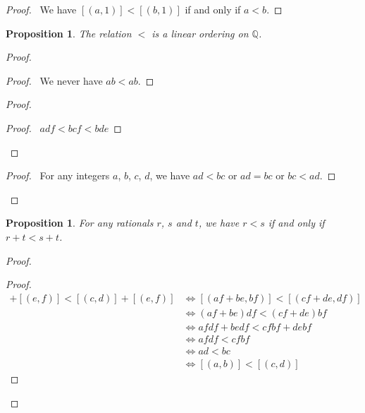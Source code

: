 \documentclass{book}
\let\qed\relax
\newtheorem{prop}[ax]{Proposition}
\theoremstyle{definition}
\begin{document}
\begin{proof}
\pf\ We have $[(a,1)] < [(b,1)]$ if and only if $a < b$. \qed
\end{proof}

\begin{prop}
The relation $<$ is a linear ordering on $\mathbb{Q}$.
\end{prop}

\begin{proof}
\pf
{}
\begin{proof}
	\pf\ We never have $ab < ab$.
\end{proof}
\begin{proof}
	\begin{proof}
		\pf\ $adf < bcf < bde$
	\end{proof}
\end{proof}
\begin{proof}
	\pf\ For any integers $a$, $b$, $c$, $d$, we have $ad < bc$ or $ad = bc$ or $bc < ad$.
\end{proof}
\qed
\end{proof}

\begin{prop}
For any rationals $r$, $s$ and $t$, we have $r < s$ if and only if $r + t < s + t$.
\end{prop}

\begin{proof}
\pf
{}
\begin{proof}
	\pf
	\begin{align*}
		[(a,b)] + [(e,f)] < [(c,d)] + [(e,f)] & \Leftrightarrow [(af + be, bf)] < [(cf + de, df)] \\
		& \Leftrightarrow (af + be) df < (cf+de)bf \\
		& \Leftrightarrow afdf + bedf < cfbf + debf \\
		& \Leftrightarrow afdf < cfbf \\
		& \Leftrightarrow ad < bc \\
		& \Leftrightarrow [(a,b)] < [(c,d)]
	\end{align*}
\end{proof}
\qed
\end{proof}
\end{document}
